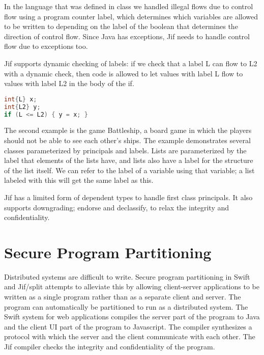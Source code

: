 \documentclass{article}
\begin{document}
In the language that was defined in class we handled illegal flows due to control flow using a program counter label, which determines which variables are allowed to be written to depending on the label of the boolean that determines the direction of control flow. Since Java has exceptions, Jif needs to handle control flow due to exceptions too.

Jif supports dynamic checking of labels: if we check that a label L can flow to L2 with a dynamic check, then code is allowed to let values with label L flow to values with label L2 in the body of the if.

\begin{lstlisting}[language=Java]
int{L} x; 
int{L2} y; 
if (L <= L2) { y = x; }
\end{lstlisting}

The second example is the game Battleship, a board game in which the players should not be able to see each other's ships. The example demonstrates several classes parameterized by principals and labels. Lists are parameterized by the label that elements of the lists have, and lists also have a label for the structure of the list itself. We can refer to the label of a variable using that variable; a list labeled with {this} will get the same label as this.

\begin{landscape}

\end{landscape}

Jif has a limited form of dependent types to handle first class principals. It also supports downgrading; endorse and declassify, to relax the integrity and confidentiality.


\section{Secure Program Partitioning}

Distributed systems are difficult to write. Secure program partitioning in Swift \cite{chong2007secure} and Jif/split \cite{zdancewic2001untrusted} attempts to alleviate this by allowing client-server applications to be written as a single program rather than as a separate client and server. The program can automatically be partitioned to run as a distributed system. The Swift system for web applications compiles the server part of the program to Java and the client UI part of the program to Javascript. The compiler synthesizes a protocol with which the server and the client communicate with each other. The Jif compiler checks the integrity and confidentiality of the program. 
\end{document}
